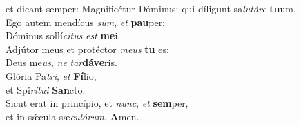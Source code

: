 \evenverse et dicant semper: Magnificétur Dóminus: qui díligunt sa\textit{lu}\textit{tá}\textit{re} \textbf{tu}um.\\
\oddverse Ego autem mendícus \textit{sum}, \textit{et} \textbf{pau}per:~\*\\
\oddverse Dóminus sollí\textit{ci}\textit{tus} \textit{est} \textbf{me}i.\\
\evenverse Adjútor meus et protéctor \textit{me}\textit{us} \textbf{tu} es:~\*\\
\evenverse Deus me\textit{us}, \textit{ne} \textit{tar}\textbf{dá}\textbf{ve}ris.\\
\oddverse Glória Pa\textit{tri}, \textit{et} \textbf{Fí}lio,~\*\\
\oddverse et Spi\textit{rí}\textit{tu}\textit{i} \textbf{San}cto.\\
\evenverse Sicut erat in princípio, et \textit{nunc}, \textit{et} \textbf{sem}per,~\*\\
\evenverse et in sǽcula sæ\textit{cu}\textit{ló}\textit{rum}. \textbf{A}men.\\
